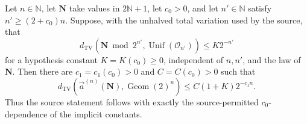 \begin{proposition}
\label{prop:Tao-v7-Prop19-valuation-law}
Let \(n\in\mathbb N\), let \(\mathbf N\) take values in
\(2\mathbb N+1\), let \(c_0>0\), and let
\(n'\in\mathbb N\) satisfy \(n'\geq(2+c_0)n\).  Suppose, with the unhalved
total variation used by the source, that
\begin{equation}
\label{eq:Tao-Prop19-hypothesis}
 d_{\mathrm{TV}}\left(
 \mathbf N\bmod2^{n'},\operatorname{Unif}(\mathcal O_{n'})
 \right)\leq K2^{-n'}
\end{equation}
for a hypothesis constant \(K=K(c_0)\geq0\), independent of
\(n,n'\), and the law of \(\mathbf N\).  Then there are
\(c_1=c_1(c_0)>0\) and \(C=C(c_0)>0\) such that
\begin{equation}
\label{eq:Tao-Prop19-conclusion}
 d_{\mathrm{TV}}\left(
 \vec a^{(n)}(\mathbf N),\operatorname{Geom}(2)^n
 \right)\leq C(1+K)2^{-c_1n}.
\end{equation}
Thus the source statement follows with exactly the source-permitted
\(c_0\)-dependence of the implicit constants.
\end{proposition}

